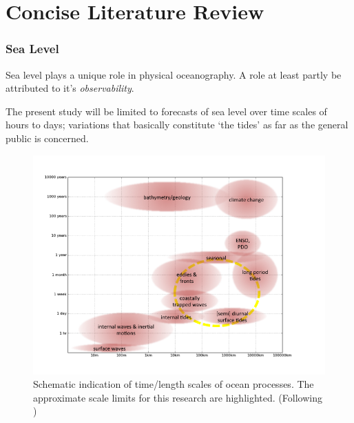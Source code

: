 \newpage
\section{Concise Literature Review}  
\label{S:REVIEW} 

\subsubsection{Sea Level}
Sea level plays a unique role in physical oceanography. A role at least partly be attributed to it's \emph{observability}\citep{Wilson:2010hy}.


The present study will be limited to forecasts of sea level over time scales of hours to days; variations that basically constitute `the tides' as far as the general public is concerned.


\begin{figure}[!h]
\begin{center}
\includegraphics[width=130mm]{figures/diagrams/ocean_scales.png}
\caption{Schematic indication of time/length scales of ocean processes.  The approximate scale limits for this research are highlighted. (Following \citet{Chelton:2001ws} )}
\label{fig:SCALES}
\end{center}
\end{figure}


